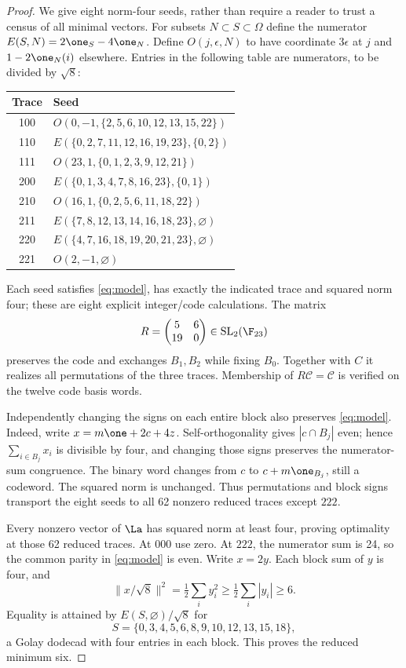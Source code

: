 \begin{proof}
We give eight norm-four seeds, rather than require a reader to trust a census of all minimal vectors. For subsets $N\subset S\subset\Omega$ define the numerator
$E(S,N)=2\one_S-4\one_N$. Define $O(j,\epsilon,N)$ to have coordinate $3\epsilon$ at $j$ and $1-2\one_N(i)$ elsewhere. Entries in the following table are numerators, to be divided by $\sqrt8$:
\begin{center}\small
\begin{tabular}{cl}
\toprule
Trace&Seed\\\midrule
100&$O(0,-1,\{2,5,6,10,12,13,15,22\})$\\
110&$E(\{0,2,7,11,12,16,19,23\},\{0,2\})$\\
111&$O(23,1,\{0,1,2,3,9,12,21\})$\\
200&$E(\{0,1,3,4,7,8,16,23\},\{0,1\})$\\
210&$O(16,1,\{0,2,5,6,11,18,22\})$\\
211&$E(\{7,8,12,13,14,16,18,23\},\varnothing)$\\
220&$E(\{4,7,16,18,19,20,21,23\},\varnothing)$\\
221&$O(2,-1,\varnothing)$\\\bottomrule
\end{tabular}
\end{center}
Each seed satisfies \eqref{eq:model}, has exactly the indicated trace and squared norm four; these are eight explicit integer/code calculations. The matrix
\[
R=\begin{pmatrix}5&6\\19&0\end{pmatrix}\in\operatorname{SL}_2(\F_{23})
\]
preserves the code and exchanges $B_1,B_2$ while fixing $B_0$. Together with $C$ it realizes all permutations of the three traces. Membership of $R\mathcal C=\mathcal C$ is verified on the twelve code basis words.

Independently changing the signs on each entire block also preserves \eqref{eq:model}. Indeed, write $x=m\one+2c+4z$. Self-orthogonality gives $|c\cap B_j|$ even; hence $\sum_{i\in B_j}x_i$ is divisible by four, and changing those signs preserves the numerator-sum congruence. The binary word changes from $c$ to $c+m\one_{B_j}$, still a codeword. The squared norm is unchanged. Thus permutations and block signs transport the eight seeds to all 62 nonzero reduced traces except $222$.

Every nonzero vector of $\La$ has squared norm at least four, proving optimality at those 62 reduced traces. At $000$ use zero. At $222$, the numerator sum is 24, so the common parity in \eqref{eq:model} is even. Write $x=2y$. Each block sum of $y$ is four, and
\[
\|x/\sqrt8\|^2=\tfrac12\sum_i y_i^2
\ge\tfrac12\sum_i|y_i|\ge6.
\]
Equality is attained by $E(S,\varnothing)/\sqrt8$ for
\[
S=\{0,3,4,5,6,8,9,10,12,13,15,18\},
\]
a Golay dodecad with four entries in each block. This proves the reduced minimum six.


\end{proof}
